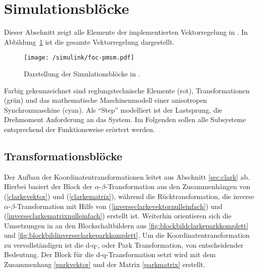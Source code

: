 

\section{Simulationsblöcke}\label{sec:math-model-pmsm}

Dieser Abschnitt zeigt alle Elemente der implementierten Vektorregelung in  .
In Abbildung~\ref{fig:foc-pmsm} ist die gesamte Vektorregelung dargestellt.

\begin{figure}[h!]
	\texttt{[image: /simulink/foc-pmsm.pdf]}
	\label{fig:foc-pmsm}
	\caption{Darstellung der Simulationsblöcke in .}
\end{figure}

Farbig gekennzeichnet sind reglungstechnische Elemente (rot), Transformationen (grün) und das mathematische Maschinenmodell einer anisotropen Synchronmaschine (cyan).
Als \enquote{Step} modelliert ist der Lastsprung, die Drehmoment Anforderung an das System.
Im Folgenden sollen alle Subsysteme entsprechend der Funktionsweise erörtert werden.

\subsection{Transformationsblöcke}

Der Aufbau der Koordinatentransformationen leitet aus Abschnitt \ref{sec:clark} ab. 
Hierbei basiert der Block der $\alpha$-$\beta$-Transformation aus den Zusammenhängen von (\ref{clarkevektor}) und (\ref{clarkematrix}), während die Rücktransformation, die inverse $\alpha$-$\beta$-Transformation mit Hilfe von (\ref{inverseclarkevektornulleinfach}) und (\ref{inverseclarkematrixnulleinfach}) erstellt ist.
Weiterhin orientieren sich die Umsetzungen in  an den Blockschaltbildern aus \ref{fig:blockbildclarkeparkkomplett} und \ref{fig:blockbildinverseclarkeparkkomplett}.
Um die Koordinatentransformation zu vervollständigen ist die d-q-, oder Park Transformation, von entscheidender Bedeutung.
Der Block für die d-q-Transformation setzt wird mit dem Zusammenhang \ref{parkvektor} und der Matrix \ref{parkmatrix} erstellt. 


